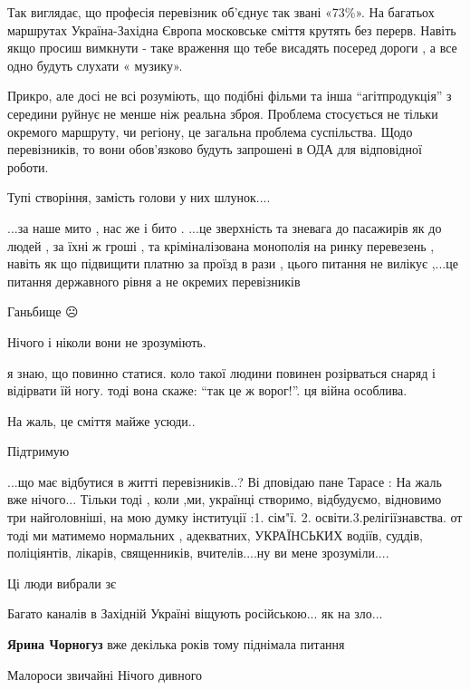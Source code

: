 \begin{itemize}
Так виглядає, що професія перевізник об’єднує так звані «73\%». На багатьох
маршрутах Україна-Західна Європа московське сміття крутять без перерв. Навіть
якщо просиш вимкнути - таке враження що тебе висадять посеред дороги , а все
одно будуть слухати « музику».


Прикро, але досі не всі розуміють, що подібні фільми та інша \enquote{агітпродукція} з
середини руйнує не менше ніж реальна зброя. Проблема стосується не тільки
окремого маршруту, чи регіону, це загальна проблема суспільства. Щодо
перевізників, то вони обов'язково будуть запрошені в ОДА для відповідної
роботи.


Тупі створіння, замість голови у них шлунок....

...за наше мито , нас же і бито .
...це зверхність та зневага до пасажирів як до людей , за їхні ж гроші , та кріміналізована монополія на ринку перевезень , навіть як що підвищити платню за проїзд в рази , цього питання не вилікує ,...це питання державного рівня а не окремих перевізників

Ганьбище ☹️

Нічого і ніколи вони не зрозуміють.

я знаю, що повинно статися.
коло такої людини повинен розірваться снаряд і відірвати їй ногу. тоді вона скаже: \enquote{так це ж ворог!}.
ця війна особлива.

На жаль, це сміття майже усюди..

Підтримую


...що має відбутися в житті перевізників..? Ві дповідаю пане Тарасе : На жаль
вже нічого... Тільки тоді , коли ,ми, українці створимо, відбудуємо, відновимо
три найголовніші, на мою думку інституції :1. сім"ї. 2.
освіти.3.релігіїзнавства. от тоді ми матимемо нормальних , адекватних,
УКРАЇНСЬКИХ водіїв, суддів, поліціянтів, лікарів, священників, вчителів....ну
ви мене зрозуміли....


Ці люди вибрали зє

Багато каналів в Західній Україні віщують російською... як на зло...

\textbf{Ярина Чорногуз} вже декілька років тому піднімала питання

Малороси звичайні
Нічого дивного


\end{itemize}
